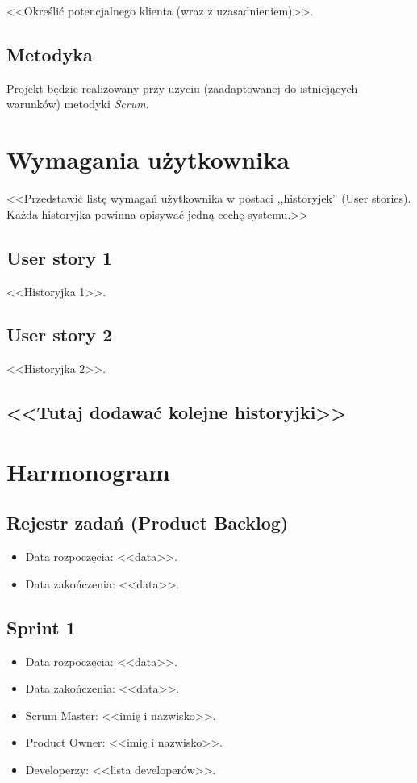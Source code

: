 \documentclass[a4paper]{article}
\begin{document}
<<Określić potencjalnego klienta (wraz z uzasadnieniem)>>.

\subsection{Metodyka}

Projekt będzie realizowany przy użyciu (zaadaptowanej do istniejących warunków) metodyki {\em Scrum}. 

\section{Wymagania użytkownika}
<<Przedstawić listę wymagań użytkownika w postaci ,,historyjek'' (User stories). Każda historyjka powinna opisywać jedną cechę systemu.>>

\subsection{User story 1}
<<Historyjka 1>>.

\subsection{User story 2}
<<Historyjka 2>>.

\subsection*{<<Tutaj dodawać kolejne historyjki>>}

\section{Harmonogram}

\subsection{Rejestr zadań (Product Backlog)}

\begin{itemize}
\item Data rozpoczęcia: <<data>>.
\item  Data zakończenia: <<data>>.
\end{itemize}

\subsection{Sprint 1}

\begin{itemize}
\item Data rozpoczęcia: <<data>>.
\item Data zakończenia: <<data>>.
\item Scrum Master: <<imię i nazwisko>>.
\item Product Owner: <<imię i nazwisko>>.
\item Developerzy: <<lista developerów>>.
\end{itemize}
\end{document}

